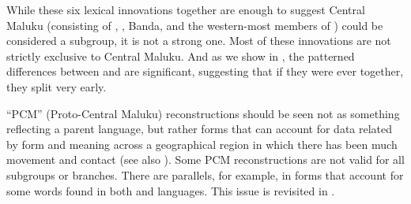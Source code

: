 While these six lexical innovations together are enough to suggest
Central Maluku (consisting of ,
, Banda, and the western-most members of )
could be considered a subgroup,
it is not a strong one.
Most of these innovations are not strictly exclusive to Central Maluku.
And as we show in ,
the patterned differences between 
and  are significant,
suggesting that if they were ever together,
they split very early.

“PCM” (Proto-Central Maluku) reconstructions should be seen not
as something reflecting a parent language,
but rather forms that can account for data related by form
and meaning across a geographical region in which there has been
much movement and contact (see also ).
Some PCM reconstructions are not valid for all subgroups or branches.
There are parallels, for example,
in forms that account for some words found in
both  and  languages.
This issue is revisited in .


